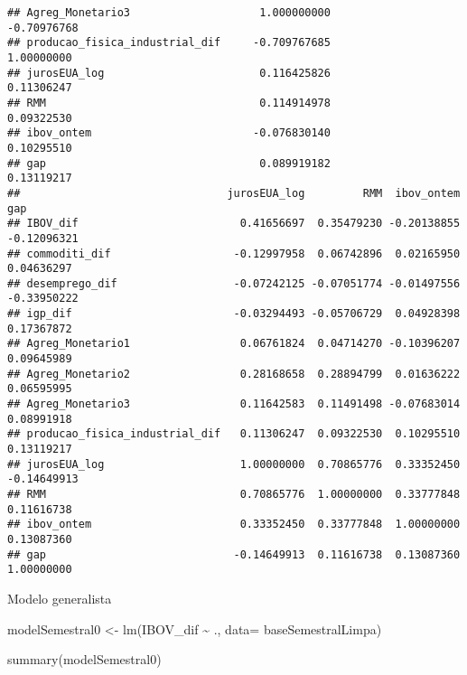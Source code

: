 \documentclass[
]{article}
\newenvironment{Shaded}{\begin{snugshade}}{\end{snugshade}}
\newcommand{\AttributeTok}[1]{\textcolor[rgb]{0.77,0.63,0.00}{#1}}
\newcommand{\FunctionTok}[1]{\textcolor[rgb]{0.00,0.00,0.00}{#1}}
\newcommand{\NormalTok}[1]{#1}
\newcommand{\OtherTok}[1]{\textcolor[rgb]{0.56,0.35,0.01}{#1}}
\newcommand{\SpecialCharTok}[1]{\textcolor[rgb]{0.00,0.00,0.00}{#1}}
\begin{document}
\begin{verbatim}
## Agreg_Monetario3                    1.000000000                    -0.70976768
## producao_fisica_industrial_dif     -0.709767685                     1.00000000
## jurosEUA_log                        0.116425826                     0.11306247
## RMM                                 0.114914978                     0.09322530
## ibov_ontem                         -0.076830140                     0.10295510
## gap                                 0.089919182                     0.13119217
##                                jurosEUA_log         RMM  ibov_ontem         gap
## IBOV_dif                         0.41656697  0.35479230 -0.20138855 -0.12096321
## commoditi_dif                   -0.12997958  0.06742896  0.02165950  0.04636297
## desemprego_dif                  -0.07242125 -0.07051774 -0.01497556 -0.33950222
## igp_dif                         -0.03294493 -0.05706729  0.04928398  0.17367872
## Agreg_Monetario1                 0.06761824  0.04714270 -0.10396207  0.09645989
## Agreg_Monetario2                 0.28168658  0.28894799  0.01636222  0.06595995
## Agreg_Monetario3                 0.11642583  0.11491498 -0.07683014  0.08991918
## producao_fisica_industrial_dif   0.11306247  0.09322530  0.10295510  0.13119217
## jurosEUA_log                     1.00000000  0.70865776  0.33352450 -0.14649913
## RMM                              0.70865776  1.00000000  0.33777848  0.11616738
## ibov_ontem                       0.33352450  0.33777848  1.00000000  0.13087360
## gap                             -0.14649913  0.11616738  0.13087360  1.00000000
\end{verbatim}

Modelo generalista

\begin{Shaded}
\begin{Highlighting}[]
\NormalTok{modelSemestral0 }\OtherTok{\textless{}{-}} \FunctionTok{lm}\NormalTok{(IBOV\_dif }\SpecialCharTok{\textasciitilde{}}\NormalTok{ ., }\AttributeTok{data=}\NormalTok{ baseSemestralLimpa)}

\FunctionTok{summary}\NormalTok{(modelSemestral0)}
\end{Highlighting}
\end{Shaded}
\end{document}
